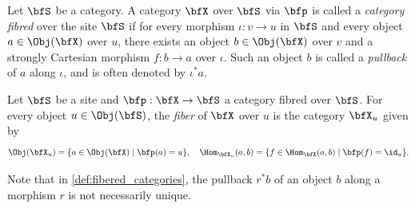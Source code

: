     \begin{definition}\label{def:fibered_categories}
        Let \(\bfS\) be a category.
        A category \(\bfX\) over \(\bfS\) via \(\bfp\) is called a \emph{category fibred} over the site \(\bfS\) if
        for every morphism \(\iota: v\to u\) in \(\bfS\) and every object \(a \in \Obj(\bfX)\) over \(u\), there exists an object \(b \in \Obj(\bfX)\) over \(v\) and a strongly Cartesian morphism \(f: b \to a\) over \(\iota\).
        Such an object \(b\) is called a \emph{pullback} of \(a\) along \(\iota\), and is often denoted by \(\iota^*a\).
    \end{definition}

    \begin{definition}\label{def:fiber_of_fiber_category}
        Let \(\bfS\) be a site and \(\bfp: \bfX \to \bfS\) a category fibred over \(\bfS\).
        For every object \(u \in \Obj(\bfS)\), the \emph{fiber} of \(\bfX\) over \(u\) is the category \(\bfX_u\) given by
        \[ \Obj(\bfX_u) = \{ a \in \Obj(\bfX) \mid \bfp(a) = u \}, \quad \Hom_{\bfX_u}(a,b) = \{ f \in \Hom_{\bfX}(a,b) \mid \bfp(f) = \id_u \}. \]
    \end{definition}

    \begin{remark}\label{rmk:choice_of_pullback_in_fibered_category}
        Note that in \cref{def:fibered_categories}, the pullback \(r^*b\) of an object \(b\) along a morphism \(r\) is not necessarily unique.
    \end{remark}


